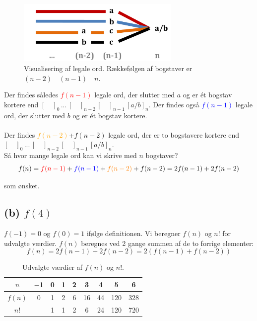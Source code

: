 \begin{figure}[H]
\centering
\includegraphics[width=0.7\textwidth]{Opg2/fig/2a.pdf}
\caption{Visualisering af legale ord. Rækkefølgen af bogstaver er $(n-2) \quad (n-1) \quad n$.}
\label{fig:2a}
\end{figure}

Der findes således \textcolor{red}{$f(n-1)$} legale ord, der slutter med $a$ og er ét bogstav kortere end $[\quad]_0 \, ... \, [\quad]_{n-2} \, [\quad]_{n-1} \, [a/b]_n$. Der findes også \textcolor{blue}{$f(n-1)$} legale ord, der slutter med $b$ og er ét bogstav kortere.\\
\\
Der findes \textcolor{orange}{$f(n-2)$}+\textcolor{black}{$f(n-2)$} legale ord, der er to bogstavere kortere end \\
$[\quad]_0 \, ... \, [\quad]_{n-2} \, [\quad]_{n-1} \, [a/b]_n$.\\

Så hvor mange legale ord kan vi skrive med $n$ bogstaver?
\begin{equation}
f(n) = \textcolor{red}{f(n-1)} + \textcolor{blue}{f(n-1)} + \textcolor{orange}{f(n-2)}  + \textcolor{black}{f(n-2)} = 2 f(n-1) + 2 f(n-2)
\end{equation}

som ønsket.

\subsection*{(b) $f(4)$}
$f(-1)=0$ og $f(0)=1$ ifølge definitionen. Vi beregner $f(n)$ og $n!$ for udvalgte værdier. $f(n)$ beregnes ved 2 gange summen af de to forrige elementer:
\begin{equation}
f(n) = 2 f(n-1) + 2 f(n-2) = 2 \left( f(n-1) + f(n-2) \right)
\end{equation}

\renewcommand{\arraystretch}{1.3}
\begin{table}[H]
\begin{center}
    \begin{tabular}{ccccccccc}
    \hline
    $n$    & $-$1 & 0 & 1 & 2 & 3  & 4  & 5   & 6   \\ \hline
    $f(n)$ & 0  & 1 & 2 & 6 & 16 & 44 & 120 & 328 \\ \hline
    $n!$   &   & 1 & 1 & 2 & 6  & 24 & 120 & 720 \\ \hline
    \end{tabular}
    \vspace{-0.5cm}
    \caption{Udvalgte værdier af $f(n)$ og $n!$.}
    \label{tab:2b}
    \end{center}
\end{table}
\renewcommand{\arraystretch}{1.0}

